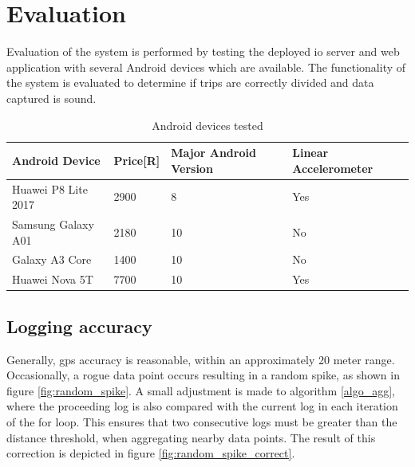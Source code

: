 \section{Evaluation}
Evaluation of the system is performed by testing the deployed \ac{io} server and web application with several Android devices which are available.
The functionality of the system is evaluated to determine if trips are correctly divided and data captured is sound.

\begin{table}[H]
\caption{Android devices tested}
\label{tab:android_devices_tested}
\begin{tabular}{llll}
\hline
Android Device      & Price[R]  & Major Android Version & Linear Accelerometer \\ \hline
Huawei P8 Lite 2017 & 2900     & 8                     & Yes                  \\
Samsung Galaxy A01  & 2180     & 10                    & No                   \\
Galaxy A3 Core      & 1400     & 10                    & No                   \\
Huawei Nova 5T      & 7700     & 10                    & Yes                  \\ \hline
\end{tabular}
\end{table}

\subsection{Logging accuracy}
Generally, \ac{gps} accuracy is reasonable, within an approximately 20 meter range.
Occasionally, a rogue data point occurs resulting in a random spike, as shown in figure \ref{fig:random_spike}.
A small adjustment is made to algorithm \ref{algo_agg}, where the proceeding log is also compared with the current log in each iteration of the for loop.
This ensures that two consecutive logs must be greater than the distance threshold, when aggregating nearby data points.
The result of this correction is depicted in figure \ref{fig:random_spike_correct}.

